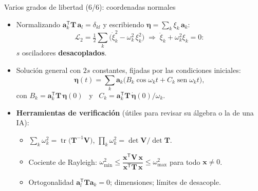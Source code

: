 \documentclass[spanish]{beamer}
\newcommand{\Tm}{\mathbf{T}}              %
\newcommand{\Vm}{\mathbf{V}}              %
\newcommand{\bfeta}{\boldsymbol{\eta}}    %
\newcommand{\ba}{\boldsymbol{a}}          %
\begin{document}
\begin{frame}{Varios grados de libertad (6/6): coordenadas normales}
\small
\begin{itemize}
\item<1-> Normalizando $\ba_k^{\mathsf T}\Tm\,\ba_l=\delta_{kl}$ y escribiendo $\bfeta=\sum_k\xi_k\,\ba_k$:
\[
\mathcal{L}_2=\tfrac12\sum_k\big(\dot\xi_k^2-\omega_k^2\,\xi_k^2\big)\;\Longrightarrow\;\ddot\xi_k+\omega_k^2\xi_k=0 :
\]
$s$ osciladores \textbf{desacoplados}.
\item<2-> Solución general con $2s$ constantes, fijadas por las condiciones iniciales:
\[
\bfeta(t)=\sum_k\ba_k\big(B_k\cos\omega_kt+C_k\operatorname{sen}\omega_kt\big),
\]
con $B_k=\ba_k^{\mathsf T}\Tm\,\bfeta(0)$ \ y \ $C_k=\ba_k^{\mathsf T}\Tm\,\dot{\bfeta}(0)/\omega_k$.
\item<3-> \textbf{Herramientas de verificación} (útiles para revisar su álgebra o la de una IA):
\begin{itemize}
\item $\sum_k\omega_k^2=\operatorname{tr}\big(\Tm^{-1}\Vm\big)$, \qquad $\prod_k\omega_k^2=\det\Vm/\det\Tm$.
\item Cociente de Rayleigh: $\omega_{\min}^2\le\dfrac{\boldsymbol x^{\mathsf T}\Vm\,\boldsymbol x}{\boldsymbol x^{\mathsf T}\Tm\,\boldsymbol x}\le\omega_{\max}^2$ para todo $\boldsymbol x\neq0$.
\item Ortogonalidad $\ba_l^{\mathsf T}\Tm\ba_k=0$; dimensiones; límites de desacople.
\end{itemize}
\end{itemize}
\end{frame}

\end{document}
